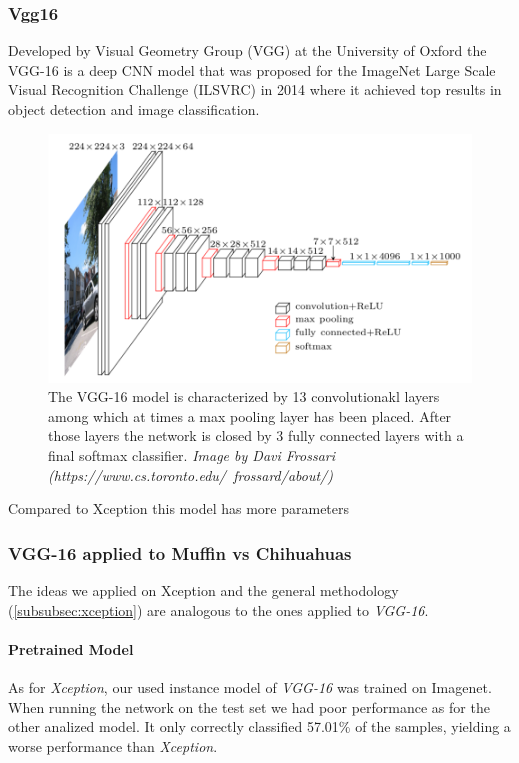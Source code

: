 \subsubsection{Vgg16}
Developed by Visual Geometry Group (VGG) at the University of Oxford the VGG-16\cite{simonyan2015deep} is a deep CNN model that
was proposed for the ImageNet Large Scale Visual Recognition Challenge (ILSVRC) in 2014 where it achieved top results in object detection and image classification.

\begin{figure}[h]
    \includegraphics[scale=0.7]{imgs/vgg_arch}
    \caption{
        The VGG-16 model is characterized by 13 convolutionakl layers among which at times a max pooling layer has been placed.
        After those layers the network is closed by 3 fully connected layers with a final softmax classifier.
        \textit{Image by Davi Frossari (https://www.cs.toronto.edu/~frossard/about/)}
    }\label{fig:vgg16}
\end{figure}

Compared to Xception this model has more parameters

\subsubsection{VGG-16 applied to Muffin vs Chihuahuas}
The ideas we applied on Xception and the general methodology (\ref{subsubsec:xception}) are analogous to the ones
applied to \textit{VGG-16}.


\paragraph{Pretrained Model}
As for \textit{Xception}, our used instance model of \textit{VGG-16} was trained on Imagenet.
When running the network on the test set we had poor performance as for the other analized model.
It only correctly classified 57.01\% of the samples, yielding a worse performance than \textit{Xception}.

